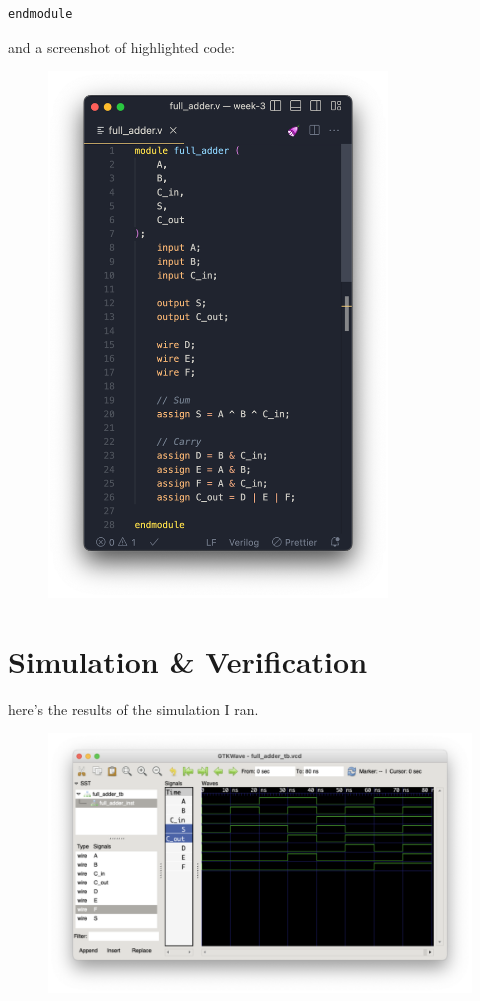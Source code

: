 \documentclass{article}
\begin{document}
\begin{enumerate}[label={\alph*)}]
\begin{lstlisting}
endmodule
        \end{lstlisting}
        and a screenshot of highlighted code:
        \newpage
        \begin{figure}[h]
            \includegraphics[width=9cm]{code-screenshot.png}
        \end{figure}
    \end{enumerate}

    \newpage

    \section*{Simulation \& Verification}

    here's the results of the simulation I ran.

    \begin{figure}[h]
        \includegraphics[width=12cm]{screenshot-of-testing.png}
    \end{figure}
\end{document}
